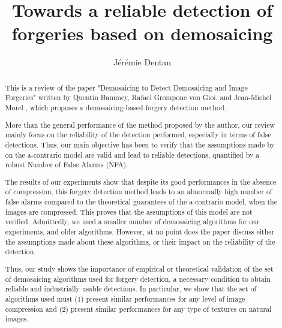 \documentclass[sigconf, nonacm]{acmart}
\begin{document}
\title{Towards a reliable detection of forgeries based on demosaicing}

\author{Jérémie Dentan}

\renewcommand{\shortauthors}{Dentan}

\begin{abstract}
This is a review of the paper "Demosaicing to Detect Demosaicing and Image Forgeries" written by Quentin Bammey, Rafael Grompone von Gioi, and Jean-Michel Morel \cite{bammey_demosaicing_2022}, which proposes a demosaicing-based forgery detection method.

More than the general performance of the method proposed by the author, our review mainly focus on the reliability of the detection performed, especially in terms of false detections. Thus, our main objective has been to verify that the assumptions made by on the a-contrario model are valid and lead to reliable detections, quantified by a robust Number of False Alarms (NFA).

The results of our experiments show that despite its good performances in the absence of compression, this forgery detection method leads to an abnormally high number of false alarms compared to the theoretical guarantees of the a-contrario model, when the images are compressed. This proves that the assumptions of this model are not verified. Admittedly, we used a smaller number of demosaicing algorithms for our experiments, and older algorithms. However, at no point does the paper discuss either the assumptions made about these algorithms, or their impact on the reliability of the detection.

Thus, our study shows the importance of empirical or theoretical validation of the set of demosaicing algorithms used for forgery detection, a necessary condition to obtain reliable and industrially usable detections. In particular, we show that the set of algorithms used must (1) present similar performances for any level of image compression and (2) present similar performances for any type of textures on natural images.

\end{abstract}
\end{document}
